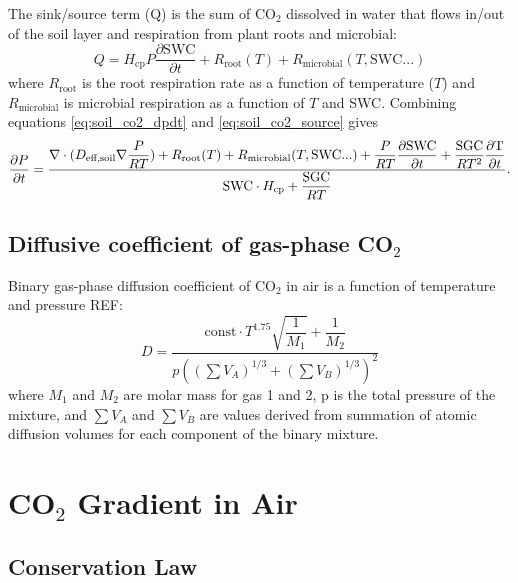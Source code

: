 \documentclass[twoside,10pt]{report}
\begin{document}
\par The sink/source term (Q) is the sum of CO$_2$ dissolved in water that flows in/out of the soil layer and respiration from plant roots and microbial:
\begin{equation}
Q = H_\text{cp} P \dfrac{\partial \text{SWC}}{\partial t} + R_\text{root}(T) + R_\text{microbial}(T,\text{SWC}...) \label{eq:soil_co2_source}
\end{equation}
where $R_\text{root}$ is the root respiration rate as a function of temperature ($T$) and $R_\text{microbial}$ is microbial respiration as a function of $T$ and SWC. Combining equations \ref{eq:soil_co2_dpdt} and \ref{eq:soil_co2_source} gives
\begin{equation}
    \dfrac{\partial P}{\partial t} = 
        \dfrac{ \nabla \cdot (D_\text{eff,soil} \nabla \dfrac{P}{RT}) + 
                R_\text{root}(T) + R_\text{microbial}(T,\text{SWC}...) +  
                \dfrac{P}{RT} \dfrac{\partial \text{SWC}}{\partial t} + 
                \dfrac{\text{SGC}}{RT^2} \dfrac{\partial \text{T}}{\partial t}}
              {\text{SWC} \cdot H_\text{cp} + \dfrac{\text{SGC}}{RT}}. \label{eq:soil_co2_dpdt_2}
\end{equation}

\subsection{Diffusive coefficient of gas-phase CO$_2$}
\par Binary gas-phase diffusion coefficient of CO$_2$ in air is a function of temperature and pressure REF:
\begin{equation}
    D = \dfrac{\text{const} \cdot T^{1.75} \sqrt{\dfrac{1}{M_1}} + \dfrac{1}{M_2}}{p \left( (\sum V_A)^{1/3} + (\sum V_B)^{1/3} \right)^2}
\end{equation}
where $M_1$ and $M_2$ are molar mass for gas 1 and 2, p is the total pressure of the mixture, and $\sum V_A$ and $\sum V_B$ are values derived from summation of atomic diffusion volumes for each component of the binary mixture.




\section{CO$_2$ Gradient in Air}

\subsection{Conservation Law}
\end{document}
